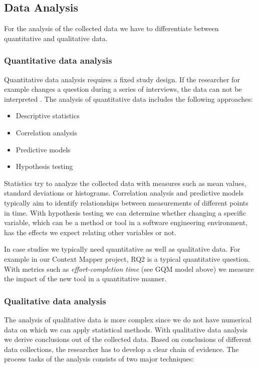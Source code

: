 \documentclass[runningheads]{llncs}
\begin{document}
\subsection{Data Analysis}
For the analysis of the collected data we have to differentiate between quantitative and qualitative data.

\subsubsection{Quantitative data analysis}
Quantitative data analysis requires a fixed study design. If the researcher for example changes a question during a series of interviews, the data can not be interpreted \cite{Wohlin:2012:ESE:2349018}. The analysis of quantitative data includes the following approaches:

\begin{itemize}
	\item Descriptive statistics
	\item Correlation analysis
	\item Predictive models
	\item Hypothesis testing
\end{itemize}

Statistics try to analyze the collected data with measures such as mean values, standard deviations or histograms. Correlation analysis and predictive models typically aim to identify relationships between measurements of different points in time. With hypothesis testing we can determine whether changing a specific variable, which can be a method or tool in a software engineering environment, has the effects we expect relating other variables or not.

In case studies we typically need quantitative as well as qualitative data. For example in our Context Mapper project, RQ2 is a typical quantitative question. With metrics such as \textit{effort-completion time} (see GQM model above) we measure the impact of the new tool in a quantitative manner.

\subsubsection{Qualitative data analysis}
The analysis of qualitative data is more complex since we do not have numerical data on which we can apply statistical methods. With qualitative data analysis we derive conclusions out of the collected data. Based on conclusions of different data collections, the researcher has to develop a clear chain of evidence. The process tasks of the analysis consists of two major techniques:
\end{document}
